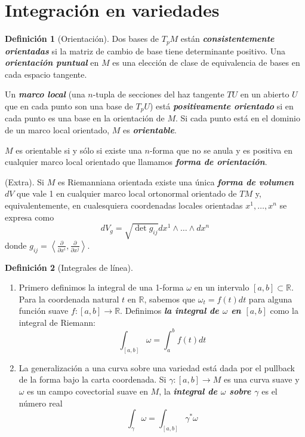 \documentclass[spanish]{article}
\theoremstyle{definition}
\newtheorem*{defn}{Definición}
\newcommand{\R}{\mathbb{R}}
\begin{document}
	\section{Integración en variedades}\label{sec:4}
	\begin{defn}[Orientación]\leavevmode
		
		Dos bases de $T_pM$ están \textbf{\textit{consistentemente orientadas}} si la matriz de cambio de base tiene determinante positivo. Una \textbf{\textit{orientación puntual}} en $M$ es una elección de clase de equivalencia de bases en cada espacio tangente. 
		
		Un \textbf{\textit{marco local}} (una $n$-tupla de secciones del haz tangente $TU$ en un abierto $U$ que en cada punto son una base de $T_pU$) está \textbf{\textit{positivamente orientado}} si en cada punto es una base en la orientación de $M$. Si cada punto está en el dominio de un marco local orientado, $M$ es \textbf{\textit{orientable}}.
		
		$M$ es orientable si y sólo si existe una $n$-forma que no se anula y es positiva en cualquier marco local orientado que llamamos \textbf{\textit{forma de orientación}}.
		
		(Extra). Si $M$ es Riemanniana orientada existe una única \textbf{\textit{forma de volumen}} $dV$ que vale 1 en cualquier marco local ortonormal orientado de $TM$ y, equivalentemente, en cualesquiera coordenadas locales orientadas $x^1,\ldots,x^n$ se expresa como
		\[dV_g=\sqrt{\det g_{ij}}dx^1\wedge\ldots\wedge dx^n\]
		donde $g_{ij}=\left\langle\frac{\partial}{\partial x^i},\frac{\partial}{\partial x^j}\right\rangle$.
	\end{defn}
	
	\iffalse
	\begin{defn}[Integrales de línea]\leavevmode
		\begin{enumerate}
			\item Primero definimos la integral de una 1-forma $\omega$ en un intervalo $[a,b]\subset\R$. Para la coordenada natural $t$ en $\R$, sabemos que $\omega_t=f(t)dt$ para alguna función suave $f:[a,b]\to\R$. Definimos \textbf{\textit{la integral de $\omega$ en $[a,b]$}} como la integral de Riemann:
			\[\int_{[a,b]}\omega=\int_a^bf(t)dt\]
			
			\item La generalización a una curva sobre una variedad está dada por el pullback de la forma bajo la carta coordenada. Si $\gamma:[a,b]\to M$ es una curva suave y $\omega$ es un campo covectorial suave en $M$, la \textbf{\textit{integral de $\omega$ sobre $\gamma$}} es el número real
			\[\int_\gamma\omega=\int_{[a,b]}\gamma^*\omega\]
		\end{enumerate}
	\end{defn}
	
\end{document}
